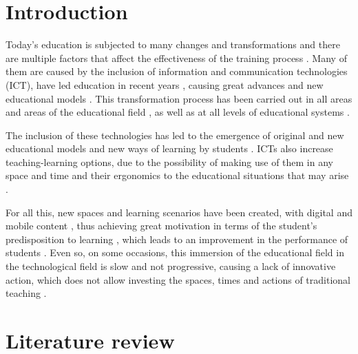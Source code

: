 \documentclass{textolivre}
\begin{document}
\begin{polyabstract}
\begin{portuguese}
\begin{abstract}
\end{abstract}
\end{portuguese}

\end{polyabstract}


\section{Introduction}\label{sec-intro}
Today's education is subjected to many changes and transformations and there are multiple factors that affect the effectiveness of the training process \cite{murillo2016}. Many of them are caused by the inclusion of information and communication technologies (ICT), have led education in recent years \cite{rodriguez2018}, causing great advances and new educational models \cite{vinals2016}. This transformation process has been carried out in all areas and areas of the educational field \cite{area2016, pereira2019}, as well as at all levels of educational systems \cite{larionova2018}.

The inclusion of these technologies has led to the emergence of original and new educational models \cite{li2019} and new ways of learning by students \cite{garrote2018}. ICTs also increase teaching-learning options, due to the possibility of making use of them in any space and time and their ergonomics to the educational situations that may arise \cite{fombonapascual2017}.

For all this, new spaces and learning scenarios have been created, with digital and mobile content \cite{radu2014}, thus achieving great motivation in terms of the student's predisposition to learning \cite{villalustredelmoral2017}, which leads to an improvement in the performance of students \cite{marinmunoz2018}. Even so, on some occasions, this immersion of the educational field in the technological field is slow and not progressive, causing a lack of innovative action, which does not allow investing the spaces, times and actions of traditional teaching \cite{llanos2017}.

\section{Literature review}
\end{document}
